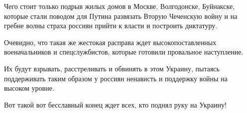 Чего стоит только подрыв жилых домов в Москве, Волгодонске, Буйнакске, которые
стали поводом для Путина развязать Вторую Чеченскую войну и на гребне волны
страха россиян прийти к власти и построить диктатуру.

Очевидно, что такая же жестокая расправа ждет высокопоставленных военачальников
и спецслужбистов, которые готовили провальное наступление.

Их будут взрывать, расстреливать и обвинять в этом Украину, пытаясь
поддерживать таким образом у россиян ненависть и поддержку войны на высоком
уровне.

Вот такой вот бесславный конец ждет всех, кто поднял руку на Украину!

